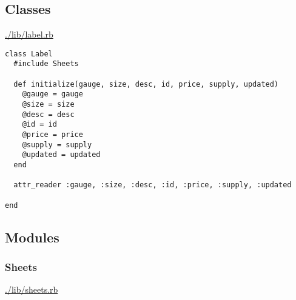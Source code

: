 \documentclass[11pt]{article}
\begin{document}
\subsection{Classes}
\label{sec-1-2}

\url{./lib/label.rb}

\begin{verbatim}
class Label
  #include Sheets

  def initialize(gauge, size, desc, id, price, supply, updated)
    @gauge = gauge
    @size = size
    @desc = desc
    @id = id
    @price = price
    @supply = supply
    @updated = updated
  end

  attr_reader :gauge, :size, :desc, :id, :price, :supply, :updated

end
\end{verbatim}

\subsection{Modules}
\label{sec-1-3}

\subsubsection{Sheets}
\label{sec-1-3-1}

\url{./lib/sheets.rb}
\end{document}
